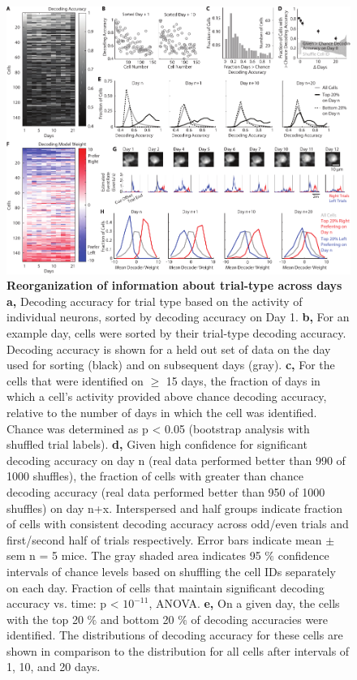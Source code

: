 \begin{figure}
\includegraphics[width=\textwidth]{figures/3_all.pdf}
\caption[Reorganization of information about trial-type across days]{\textbf{Reorganization of information about trial-type across days a,} Decoding accuracy for trial type based on the activity of individual neurons, sorted by decoding accuracy on Day 1. 
%
\textbf{b,} For an example day, cells were sorted by their trial-type decoding accuracy. Decoding accuracy is shown for a held out set of data on the day used for sorting (black) and on subsequent days (gray). 
%
\textbf{c,} For the cells that were identified on $\ge$ 15 days, the fraction of days in which a cell's activity provided above chance decoding accuracy, relative to the number of days in which the cell was identified. Chance was determined as p < 0.05 (bootstrap analysis with shuffled trial labels). 
%
\textbf{d,} Given high confidence for significant decoding accuracy on day n (real data performed better than 990 of 1000 shuffles), the fraction of cells with greater than chance decoding accuracy (real data performed better than 950 of 1000 shuffles) on day n+x. Interspersed and half groups indicate fraction of cells with consistent decoding accuracy across odd/even trials and first/second half of trials respectively. Error bars indicate mean $\pm$ sem n = 5 mice. The gray shaded area indicates 95 $\%$ confidence intervals of chance levels based on shuffling the cell IDs separately on each day. Fraction of cells that maintain significant decoding accuracy vs. time: p < $10^{-11}$, ANOVA.
%
\textbf{e,}  On a given day, the cells with the top 20 $\%$ and bottom 20 $\%$ of decoding accuracies were identified. The distributions of decoding accuracy for these cells are shown in comparison to the distribution for all cells after intervals of 1, 10, and 20 days.
}
\end{figure}
